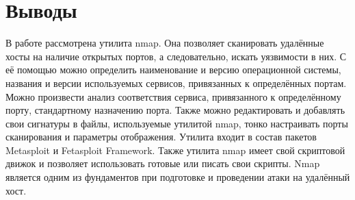\documentclass[a4paper]{article}
\begin{document}
\section{Выводы}

В работе рассмотрена утилита nmap. Она позволяет сканировать удалённые хосты на наличие открытых портов, а следовательно, искать уязвимости в них. С её помощью можно определить наименование и версию операционной системы, названия и версии используемых сервисов, привязанных к определённых портам. Можно произвести анализ соответствия сервиса, привязанного к определённому порту, стандартному назначению порта. Также можно редактировать и добавлять свои сигнатуры в файлы, используемые утилитой nmap, тонко настраивать порты сканирования и параметры отображения. Утилита входит в состав пакетов Metasploit и Fetasploit Framework. Также утилита nmap имеет свой скриптовой движок и позволяет использовать готовые или писать свои скрипты. Nmap является одним из фундаментов при подготовке и проведении атаки на удалённый хост.
\end{document}
